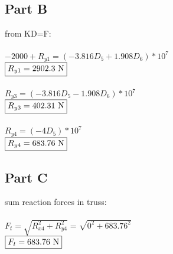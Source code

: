 \documentclass{article}
\begin{document}
\subsection*{Part B}
from KD=F: \\\\
$-2000+R_{y1}=(-3.816D_5 + 1.908D_6)*10^7$ \\
$\fbox{$R_{y1}=2902.3$ N}$ \\\\
$R_{y3}=(-3.816D_5-1.908D_6)*10^7$ \\
$\fbox{$R_{y3}=402.31$ N}$ \\\\
$R_{y4}=(-4D_5)*10^7$ \\
$\fbox{$R_{y4}=683.76$ N}$

\subsection*{Part C}
sum reaction forces in truss: \\\\
$F_{t}=\sqrt{R_{x4}^2+R_{y4}^2}=\sqrt{0^2+683.76^2}$ \\
$\fbox{$F_t=683.76$ N}$
\end{document}
